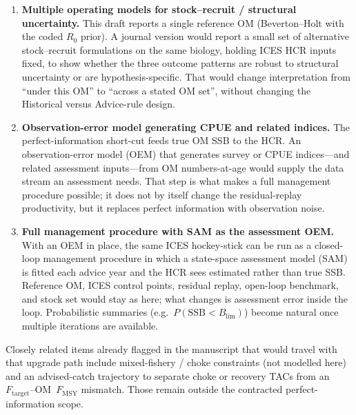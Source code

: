 \documentclass[11pt,a4paper]{article}
\newcommand{\Fmsy}{F_{\mathrm{MSY}}}
\newcommand{\Blim}{B_{\lim}}
\newcommand{\Ftar}{F_{\mathrm{target}}}
\begin{document}
\begin{enumerate}
  \item \textbf{Multiple operating models for stock--recruit /
        structural uncertainty.}
        This draft reports a single reference OM (Beverton--Holt with the
        coded $R_0$ prior). A journal version would report a small set of
        alternative stock--recruit formulations on the same biology,
        holding ICES HCR inputs fixed, to show whether the three outcome
        patterns are robust to structural uncertainty or are
        hypothesis-specific. That would change interpretation from ``under
        this OM'' to ``across a stated OM set'', without changing the
        Historical versus Advice-rule design.

  \item \textbf{Observation-error model generating CPUE and related
        indices.}
        The perfect-information short-cut feeds true OM SSB to the HCR.
        An observation-error model (OEM) that generates survey or CPUE
        indices---and related assessment inputs---from OM numbers-at-age
        would supply the data stream an assessment needs. That step is
        what makes a full management procedure possible; it does not by
        itself change the residual-replay productivity, but it replaces
        perfect information with observation noise.

  \item \textbf{Full management procedure with SAM as the assessment
        OEM.}
        With an OEM in place, the same ICES hockey-stick can be run as a
        closed-loop management procedure in which a state-space assessment
        model (SAM) is fitted each advice year and the HCR sees estimated
        rather than true SSB. Reference OM, ICES control points, residual
        replay, open-loop benchmark, and stock set would stay as here;
        what changes is assessment error inside the loop. Probabilistic
        summaries (e.g.\ $P(\mathrm{SSB}<\Blim)$) become natural once
        multiple iterations are available.
\end{enumerate}

Closely related items already flagged in the manuscript that would travel
with that upgrade path include mixed-fishery / choke constraints (not
modelled here) and an advised-catch trajectory to separate choke or
recovery TACs from an $\Ftar$--OM~$\Fmsy$ mismatch. Those remain outside
the contracted perfect-information scope.



\end{document}
